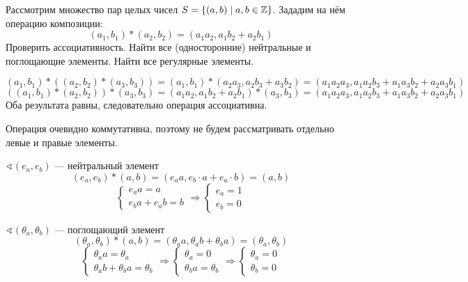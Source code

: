 \begin{exercise}
    Рассмотрим множество пар целых чисел \(S = \{(a, b) \mid a, b \in \mathbb{Z}\}\). Зададим на нём операцию композиции:
    \[(a_1, b_1) * (a_2, b_2) = (a_1a_2, a_1b_2 + a_2b_1)\]
    Проверить ассоциативность. Найти все (односторонние) нейтральные и поглощающие элементы. Найти все регулярные элементы.
\end{exercise}
\begin{solution}
    \[(a_1, b_1) * ((a_2, b_2) * (a_3, b_3)) = (a_1, b_1) * (a_2a_3, a_2b_3 + a_3b_2) = (a_1a_2a_3, a_1a_2b_3 + a_1a_3b_2 + a_2a_3b_1)\]
    \[((a_1, b_1) * (a_2, b_2)) * (a_3, b_3) = (a_1a_2, a_1b_2 + a_2b_1) * (a_3, b_3) = (a_1a_2a_3, a_1a_2b_3 + a_1a_3b_2 + a_2a_3b_1)\]
    Оба результата равны, следовательно операция ассоциативна.

    Операция очевидно коммутативна, поэтому не будем рассматривать отдельно левые и правые элементы.

    \(\sphericalangle (e_a, e_b)\) --- нейтральный элемент
    \[(e_a, e_b) * (a, b) = (e_a a, e_b \cdot a + e_a \cdot b) = (a, b)\]
    \[\begin{cases}
            e_a a = a \\
            e_b a + e_a b = b
        \end{cases} \Rightarrow \begin{cases}
            e_a = 1 \\
            e_b = 0
        \end{cases}\]

    \(\sphericalangle (\theta_a, \theta_b)\) --- поглощающий элемент
    \[(\theta_a, \theta_b) * (a, b) = (\theta_a a, \theta_a b + \theta_b a) = (\theta_a, \theta_b)\]
    \[\begin{cases}
            \theta_a a = \theta_a \\
            \theta_a b + \theta_b a = \theta_b
        \end{cases} \Rightarrow \begin{cases}
            \theta_a = 0 \\
            \theta_b a = \theta_b
        \end{cases} \Rightarrow \begin{cases}
            \theta_a = 0 \\
            \theta_b = 0
        \end{cases}\]


\end{solution}
